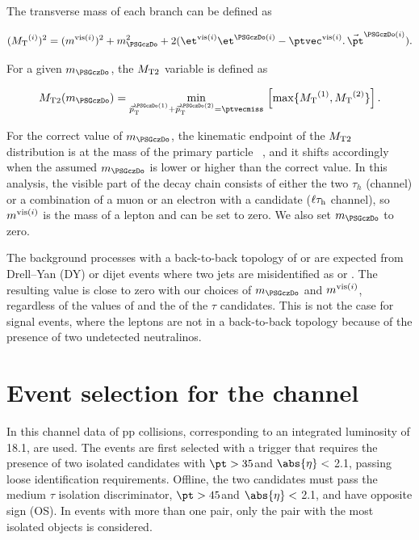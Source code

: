 The transverse mass of each branch can be defined as
\begin{linenomath}
\begin{equation}
\label{eq:mtdef}
(\mt^{(i)})^{2}= (\mvisi)^2+m^2_{\PSGczDo}+2(\etvisi\et^{\PSGczDo(i)}-{\vptvisi}.\,{\vec{\pt}^{\PSGczDo(i)}}).
\end{equation}
\end{linenomath}

For a given $m_{\PSGczDo}$, the ${M_\mathrm{ T2}}$ variable is defined as
\begin{linenomath}
\begin{equation}
\label{eq:mt2def}
\mttwo(m_{\PSGczDo})=\min_{\vec{p}^{\PSGczDo(1)}_\mathrm{T}+\vec{p}_\mathrm{T}^{\PSGczDo(2)}=\ptvecmiss}\,\left[\max\{ \mt^{(1)},\mt^{(2)}\}\right].
\end{equation}
\end{linenomath}

For the correct value of $m_{\PSGczDo}$, the kinematic endpoint of the ${M_\mathrm{ T2}}$ distribution is at the mass of the primary particle ~\cite{Affolder:2000bpa,Abazov:2002bu}, and it shifts accordingly when the assumed $m_{\PSGczDo}$ is lower or higher than the correct value. In this analysis,
the visible part of the decay chain consists of either the two $\tau_h$ (\tauTau channel)
or a combination of a muon or an electron with a \Tau candidate ($\ell\tau_\mathrm{h}$ channel), so $m^{\text{vis}(i)}$ is the mass of a lepton and can be set to zero. We also set $m_{\PSGczDo}$ to zero.


The background processes with a back-to-back topology of \tauTau  or \leptonTau 
are expected from  Drell--Yan (DY) or dijet events 
where two  jets are misidentified as \tauTau or \leptonTau. 
The resulting \mttwo value is close to zero with our choices of $m_{\PSGczDo}$ and $m^{\text{vis}(i)}$, regardless of the values of
\MPT and the \pt of  the $\tau$ candidates. 
This is not the case for signal events, where the leptons are not in a back-to-back topology because of the presence of two undetected neutralinos.
\section{\texorpdfstring{Event selection for the \tauTau channel}{Event selection for the tau-tau channel}}
\label{sect:tauTauCuts}
In this channel data of pp collisions,  corresponding to an integrated luminosity of 18.1\fbinv, are used.
The events are first selected with a trigger \cite{Chatrchyan:2011nv} that requires the presence of two isolated
\Tau candidates with $\pt > 35$\GeV and $\abs{\eta}<$ 2.1, passing loose identification requirements.
Offline, the two \Tau candidates must pass the medium $\tau$ isolation discriminator,
$\pt > 45$\GeV and $\abs{\eta}<$ 2.1, and have opposite sign (OS).
In events with more than one \tauTau pair, only the pair with the most isolated \Tau objects is considered.

